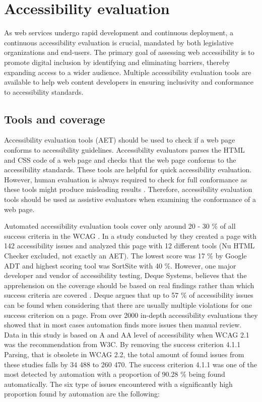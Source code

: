 \chapter{Accessibility evaluation\label{accessibility_evaluation}}

As web services undergo rapid development and continuous deployment, a continuous accessibility evaluation is crucial, mandated by both legislative organizations and end-users. The primary goal of assessing web accessibility is to promote digital inclusion by identifying and eliminating barriers, thereby expanding access to a wider audience. Multiple accessibility evaluation tools are available to help web content developers in ensuring inclusivity and conformance to accessibility standards.

\section{Tools and coverage}

Accessibility evaluation tools (AET) should be used to check if a web page conforms to accessibility guidelines. Accessibility evaluators parses the HTML and CSS code of a web page and checks that the web page conforms to the accessibility standards. These tools are helpful for quick accessibility evaluation. However, human evaluation is always required to check for full conformance as these tools might produce misleading results \citep{wcagevaluationtools}. Therefore, accessibility evaluation tools should be used as assistive evaluators when examining the conformance of a web page.

Automated accessibility evaluation tools cover only around 20 - 30 \% of all success criteria in the WCAG \citep{govukaccessibilityresults, webaimmillions, dequecoverage}. In a study conducted by \cite{govukaccessibilityresults} they created a page with 142 accessibility issues and analyzed this page with 12 different tools (Nu HTML Checker excluded, not exactly an AET). The lowest score was 17 \% by Google ADT and highest scoring tool was SortSite with 40 \%. However, one major developer and vendor of accessibility testing, Deque Systems, believes that the apprehension on the coverage should be based on real findings rather than which success criteria are covered \citep{dequecoverage}. Deque argues that up to 57 \% of accessibility issues can be found when considering that there are usually multiple violations for one success criterion on a page. From over 2000 in-depth accessibility evaluations they showed that in most cases automation finds more issues then manual review. Data in this study is based on A and AA level of accessibility when WCAG 2.1 was the recommendation from W3C. By removing the success criterion 4.1.1 Parsing, that is obsolete in WCAG 2.2, the total amount of found issues from these studies falls by 34 488 to 260 470. The success criterion 4.1.1 was one of the most detected by automation with a proportion of 90.28 \% being found automatically. The six type of issues encountered with a significantly high proportion found by automation are the following: 

